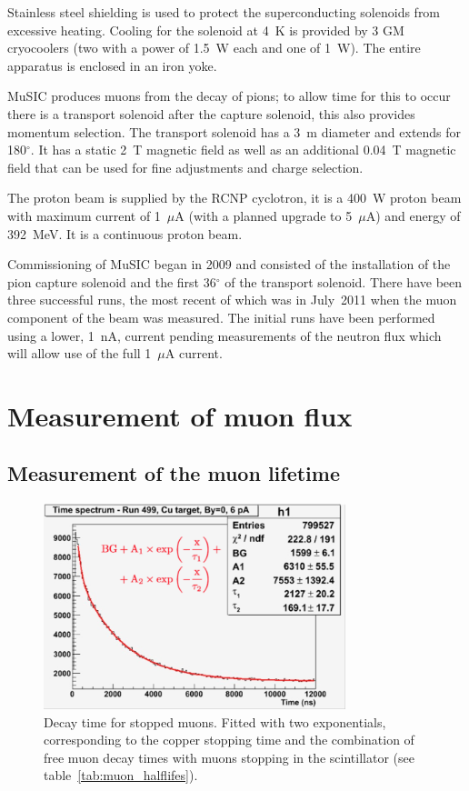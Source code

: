 \documentclass[a4paper]{jpconf}
\begin{document}
Stainless steel shielding is used to protect the superconducting solenoids from excessive heating. Cooling for the solenoid at 4~K is provided by 3 GM cryocoolers (two with a power of 1.5~W each and one of 1~W). The entire apparatus is enclosed in an iron yoke.  

MuSIC produces muons from the decay of pions; to allow time for this to occur there is a transport solenoid after the capture solenoid, this also provides momentum selection. The transport solenoid has a 3~m diameter and extends for 180$^{\circ}$. It has a static 2~T magnetic field as well as an additional 0.04~T magnetic field that can be used for fine adjustments and charge selection.

The proton beam is supplied by the RCNP cyclotron, it is a 400~W proton beam with maximum current of 1~$\mu$A (with a planned upgrade to 5~$\mu$A) and energy of 392~MeV. It is a continuous proton beam.

Commissioning of MuSIC began in 2009 and consisted of the installation of the pion capture solenoid and the first 36$^{\circ}$ of the transport solenoid. There have been three successful runs, the most recent of which was in July~2011 when the muon component of the beam was measured. The initial runs have been performed using a lower, 1~nA, current pending measurements of the neutron flux which will allow use of the full 1~$\mu$A current.



\section{Measurement of muon flux}
\subsection{Measurement of the muon lifetime}
\begin{figure}[htbp]
    \centering
        \includegraphics[height=6cm]{images/muon_decay.png}
\caption{Decay time for stopped muons. Fitted with two exponentials, corresponding to the copper stopping time and the combination of free muon decay times with muons stopping in the scintillator (see table~\ref{tab:muon_halflifes}).}
    \label{fig:muon_decay}
\end{figure}
\end{document}
